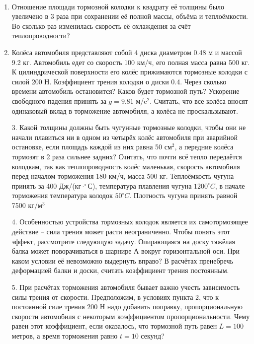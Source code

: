 
\textbf{}\\
\begin{enumerate}
\item Отношение площади тормозной колодки к квадрату её толщины было увеличено в 3 раза при сохранении её 
полной массы, объёма и теплоёмкости. Во сколько раз изменилась скорость её охлаждения за счёт теплопроводности? 
\item Колёса автомобиля представляют собой 4 диска диаметром 0.48 м и массой 9.2 кг. Автомобиль едет со скорость 
100 км/ч, его полная масса равна 500 кг. К цилиндрической поверхности его колёс прижимаются тормозные колодки с 
силой 200 Н. Коэффициент трения колодки о диски 0.4. Через сколько времени автомобиль остановится? Каков будет 
тормозной путь? Ускорение свободного падения принять за $g = 9.81$ м/c$^2$. Считать, что все колёса вносят 
одинаковый вклад в торможение автомобиля, а колёса не проскальзывают.
\item [3.] Какой толщины должны быть чугунные тормозные колодки, чтобы они не начали плавиться ни в одном из 
четырёх колёс автомобиля при аварийной остановке, если площадь каждой из них равна 50 см$^2$, а передние колёса 
тормозят в 2 раза сильнее задних? Считать, что почти всё тепло передаётся колодкам, так как теплопроводность 
колёс маленькая, скорость автомобиля перед началом торможения 180 км/ч, масса 500 кг. Теплоёмкость чугуна принять 
за 400 Дж/(кг$\cdot^{\circ}$С), температура плавления чугуна $1200^{\circ}C$, в начале торможения температура колодок $50^{\circ}C$. Плотность чугуна принять равной 7500 кг/м$^3$
\item [4.] Особенностью устройства тормозных колодок является их самотормозящее действие – сила трения 
может расти неограниченно. Чтобы понять этот эффект, рассмотрите следующую задачу. Опирающаяся на доску тяжёлая 
балка может поворачиваться в шарнире А вокруг горизонтальной оси. При каком условии её невозможно выдернуть вправо? В расчётах пренебречь деформацией балки и доски, считать коэффициент трения постоянным.  
\item [5.] При расчётах торможения автомобиля бывает важно учесть зависимость силы трения от скорости. 
Предположим, в условиях пункта 2, что к постоянной силе трения $200$ Н надо добавить поправку, пропорциональную скорости автомобиля с некоторым коэффициентом пропорциональности. Чему равен этот коэффициент, если оказалось, что тормозной путь равен $L = 100$ метров, а время торможения равно $t = 10$ секунд?
\end{enumerate}